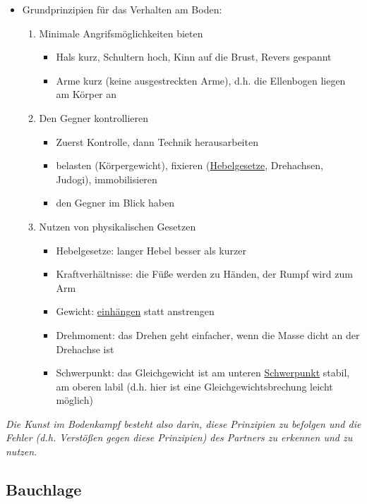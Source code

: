 \documentclass[justified, a4paper, notitlepage, captions=tableheading, nobib]{tufte-handout}
\begin{document}
\begin{itemize}
\item Grundprinzipien für das Verhalten am Boden:
\begin{enumerate}
\item Minimale Angrifsmöglichkeiten bieten
\begin{itemize}
\item Hals kurz, Schultern hoch, Kinn auf die Brust, Revers gespannt
\item Arme kurz (keine ausgestreckten Arme), d.h. die Ellenbogen liegen am Körper an
\end{itemize}
\item Den Gegner kontrollieren
\begin{itemize}
\item Zuerst \label{orgf2579db}Kontrolle, dann Technik herausarbeiten
\item \label{org5cf79c7}belasten (Körpergewicht), \label{orge4c2e9b}fixieren (\hyperref[orgc312fdb]{Hebelgesetze}, Drehachsen, Judogi), \label{org7e2a4cc}immobilisieren
\item den Gegner im Blick haben
\end{itemize}
\item \label{orge71ea5b}Nutzen von physikalischen Gesetzen
\begin{itemize}
\item \label{orgc312fdb}Hebelgesetze: langer Hebel besser als kurzer
\item \label{org07c76df}Kraftverhältnisse: die Füße werden zu Händen, der Rumpf wird zum Arm
\item \label{org5585b99}Gewicht: \hyperref[org52ff7c3]{einhängen} statt anstrengen
\item \label{org81e04b7}Drehmoment: das Drehen geht einfacher, wenn die Masse dicht an der Drehachse ist
\item \label{org726a7ab}Schwerpunkt: das Gleichgewicht ist am unteren \hyperref[org726a7ab]{Schwerpunkt} stabil, am oberen labil (d.h. hier ist eine \label{orgc2c271a}Gleichgewichtsbrechung leicht möglich)
\end{itemize}
\end{enumerate}
\end{itemize}

\emph{Die Kunst im Bodenkampf besteht also darin, diese Prinzipien zu befolgen und die Fehler (d.h. Verstößen gegen diese Prinzipien) des Partners zu erkennen und zu nutzen.}

\newpage
\subsection{\label{orgb109807}Bauchlage }
\label{sec:org5e93ca0}
\end{document}
